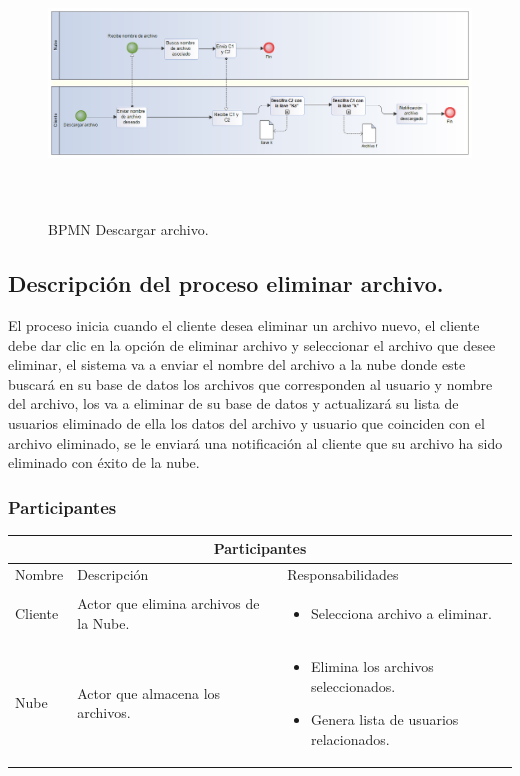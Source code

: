 \begin{figure}[H]
\centering
\includegraphics[width=16cm, height=7cm]{./images/BPM_Descargar.png}
\caption{BPMN Descargar archivo.}

\end{figure}

\vspace{3cm}
\subsection{Descripción del proceso eliminar archivo.}

El proceso inicia cuando el cliente desea eliminar un archivo nuevo, el cliente debe dar clic en la opción de eliminar archivo y seleccionar el archivo que desee eliminar, el sistema va a enviar el nombre del archivo a la nube donde este buscará en su base de datos los archivos que corresponden al usuario y nombre del archivo, los va a eliminar de su base de datos y actualizará su lista de usuarios eliminado de ella los datos del archivo y usuario que coinciden con el archivo eliminado, se le enviará una notificación al cliente que su archivo ha sido eliminado con éxito de la nube.\\



\subsubsection{Participantes}

\begin{tabular}{ |p{2cm}|p{6cm}|p{6cm}| }
\hline
\multicolumn{3}{|c|}{ Participantes } \\
\hline

{ Nombre } & { Descripción } & { Responsabilidades} \\
\hline
{ Cliente } & Actor que elimina archivos de la Nube. & 
\begin{itemize} 
\item Selecciona archivo a eliminar.
\end{itemize} \\ 
\hline
{ Nube } & Actor que almacena los archivos. & 
\begin{itemize} 
\item Elimina los archivos seleccionados.
\item Genera lista de usuarios relacionados.
\end{itemize} \\ 
\hline
\end{tabular}

